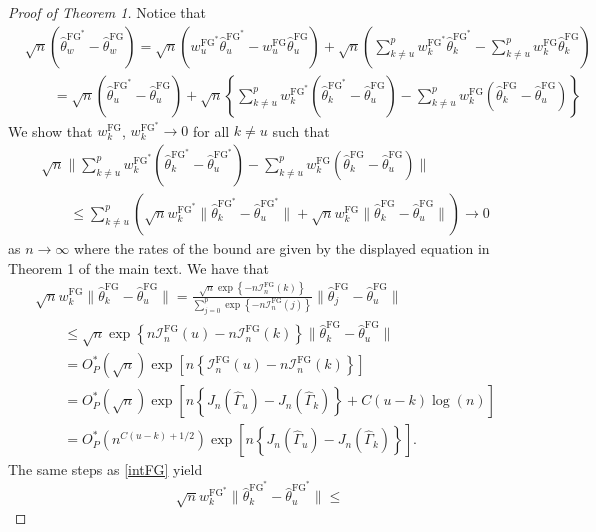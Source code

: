 \documentclass{article}\usepackage[]{graphicx}\usepackage[]{color}
\newcommand{\That}{\widehat{\theta}}
\newcommand{\TFG}{\widehat{\theta}^{\text{FG}}}
\newcommand{\Tstar}{\widehat{\theta}^{\textstyle{*}}}
\newcommand{\TstarFG}{\widehat{\theta}^{{\text{FG}}^{\textstyle{*}}}}
\newcommand{\wstar}{w^{\textstyle{*}}}
\newcommand{\Gamhat}{\widehat{\Gamma}}
\newcommand{\rootn}{\sqrt{n}}
\newcommand{\IFG}{\mathcal{I}_n^{\text{FG}}}
\newcommand{\wFG}{w^{\text{FG}}}
\newcommand{\wstarFG}{w^{{\text{FG}}^{\textstyle{*}}}}
\begin{document}
\begin{proof}[Proof of Theorem 1]
Notice that 
\begin{align*}
  &\rootn\left(\TstarFG_w - \TFG_w\right)  
    = \rootn\left(\wstarFG_u\TstarFG_u - \wFG_u\TFG_u\right) 
      + \rootn\left(\sum_{k\neq u}^p\wstarFG_k\TstarFG_k 
        - \sum_{k \neq u}^p \wFG_k\TFG_k\right) \\
  &\qquad = \rootn\left(\TstarFG_u - \TFG_u\right) 
      + \rootn\left\{\sum_{k\neq u}^p\wstarFG_k
        \left(\TstarFG_k - \TFG_u\right) 
        - \sum_{k \neq u}^p \wFG_k\left(\TFG_k - \TFG_u\right)\right\}
\end{align*}
We show that $\wFG_k$, $\wstarFG_k \to 0$ for all $k \neq u$ such that 
\begin{align*}
  &\rootn\|\sum_{k\neq u}^p\wstarFG_k\left(\TstarFG_k - \TstarFG_u\right) 
    - \sum_{k \neq u}^p \wFG_k\left(\TFG_k - \TFG_u\right)\| \\
  &\qquad\leq \sum_{k\neq u}^p\left(\rootn\wstarFG_k
    \|\TstarFG_k - \TstarFG_u\| 
    + \rootn \wFG_k\|\TFG_k - \TFG_u\|\right) \to 0
\end{align*}
as $n\to\infty$ where the rates of the bound are given by the displayed equation in Theorem 1 of the main text. We have that 
\begin{equation}
\begin{split}
  &\rootn \wFG_k\|\TFG_k - \TFG_u\| = \frac
    {
      \rootn\exp\left\{-n\IFG(k)\right\}
    }
    {
      \sum_{j=0}^p\exp\left\{-n\IFG(j)\right\}
    }\|\TFG_j - \TFG_u\| \\
  &\qquad \leq \rootn\exp\left\{n\IFG(u) - n\IFG(k)\right\}
    \|\TFG_k - \TFG_u\| \\
  &\qquad= O_P^{\textstyle{*}}\left(\sqrt{n}\right)\exp
    \left[n\left\{\IFG(u) - n\IFG(k)\right\}\right] \\
  &\qquad= O_P^{\textstyle{*}}\left(\sqrt{n}\right)
    \exp\left[n\left\{J_n(\Gamhat_u) - J_n(\Gamhat_k)\right\} 
      + C(u-k)\log(n)\right] \\
  &\qquad= O_P^{\textstyle{*}}\left(n^{C(u-k) + 1/2}\right)
    \exp\left[n\left\{J_n(\Gamhat_u) - J_n(\Gamhat_k)\right\}\right].    
\end{split}
\label{intFG}
\end{equation}
The same steps as \eqref{intFG} yield
\begin{equation}
  \rootn \wstarFG_k\|\TstarFG_k - \TstarFG_u\| \leq 

\end{equation}
\end{proof}
\end{document}
